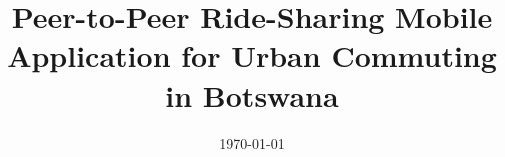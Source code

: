 \documentclass{ecsgdp}
\begin{document}
\title{Peer-to-Peer Ride-Sharing Mobile Application for Urban Commuting in Botswana} %
\date{\today} %

\frontmatter
\maketitle
\tableofcontents
\listoffigures
\listoftables

\mainmatter

\backmatter



\appendix
\makeatletter
\@mainmattertrue
\makeatother
\end{document}
